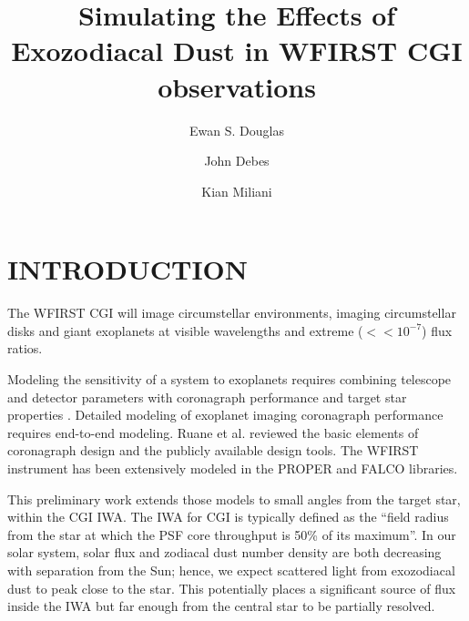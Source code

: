 \documentclass[]{spie}  %
\title{Simulating the Effects of Exozodiacal Dust in WFIRST CGI observations}
\author[a]{Ewan S. Douglas}
\author[b]{John Debes}
\author[a]{Kian Miliani}
\affil[a]{University of Arizona, Tucson, AZ, USA}
\affil[b]{STScI, Baltimore, MD, USA}
\begin{document}
 
\maketitle

\begin{abstract}

\end{abstract}


\section{INTRODUCTION}\label{sec:intro}  %

The \gls{WFIRST} \gls{CGI}\cite{spergel_wide-field_2015,noecker_coronagraph_2016} will image circumstellar environments, imaging circumstellar disks\cite{schneider_quick_2014,schneider_detection_2016} and giant exoplanets  \cite{marley_quick_2014,ygouf_data_2016-1,bailey_lessons_2018} at visible wavelengths and extreme ($<<10^{-7}$) flux ratios\cite{douglas_wfirst_2018,kasdin_wfirst_2018}.

Modeling the sensitivity of a system to exoplanets requires combining telescope and detector parameters with coronagraph performance and target star properties \cite{nemati_sensitivity_2017,savransky_exosims_2018}.
Detailed modeling of exoplanet imaging coronagraph performance requires end-to-end  modeling. Ruane et al.\cite{ruane_review_2018} reviewed the basic elements of coronagraph design and the publicly available design tools.
The \gls{WFIRST} instrument has been extensively modeled in the PROPER\cite{krist_overview_2015,krist_wfirst_2017,krist_wfirst_2018,zhou_high_2018} and FALCO\cite{riggs_fast_2018,sidick_fast_2018} libraries.

This preliminary work extends those models to small angles from the target star, within the \gls{CGI} \gls{IWA}.
The \gls{IWA} for CGI is typically defined as the ``field radius from the star at which the PSF core throughput is 50\% of its maximum''\cite{krist_numerical_2015}.
In our solar system, solar flux and zodiacal dust number density are both decreasing with separation from the Sun\cite{rowan-robinson_improved_2013,kennedy_exo-zodi_2014}; hence, we expect scattered light from exozodiacal dust to peak close to the star. This potentially places a significant source of flux inside the \gls{IWA} but far enough from the central star to be partially resolved.
\end{document}
